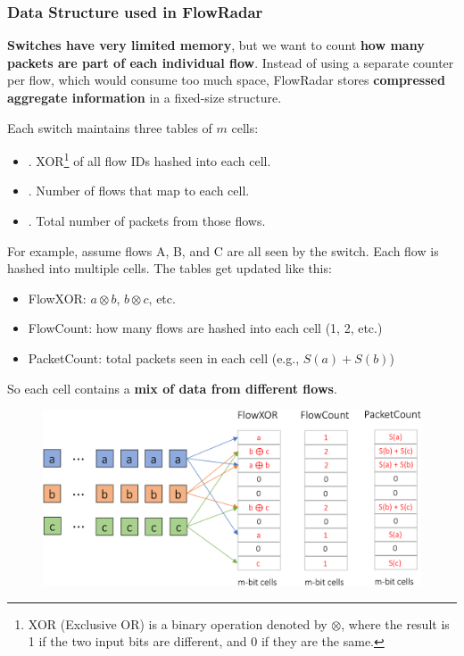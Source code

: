 \subsubsection{Data Structure used in FlowRadar}

\textbf{Switches have very limited memory}, but we want to count \textbf{how many packets are part of each individual flow}. Instead of using a separate counter per flow, which would consume too much space, FlowRadar stores \textbf{compressed aggregate information} in a fixed-size structure.

\highspace
Each switch maintains three tables of $m$ cells:
\begin{itemize}
    \item {}. XOR\footnote{%
        XOR (Exclusive OR) is a binary operation denoted by $\otimes$, where the result is 1 if the two input bits are different, and 0 if they are the same.
    } of all flow IDs hashed into each cell.
    \item {}. Number of flows that map to each cell.
    \item {}. Total number of packets from those flows.
\end{itemize}
For example, assume flows A, B, and C are all seen by the switch. Each flow is hashed into multiple cells. The tables get updated like this:
\begin{itemize}
    \item FlowXOR: $a \otimes b$, $b \otimes c$, etc.
    \item FlowCount: how many flows are hashed into each cell (1, 2, etc.)
    \item PacketCount: total packets seen in each cell (e.g., $S(a) + S(b)$)
\end{itemize}
So each cell contains a \textbf{mix of data from different flows}.
\begin{figure}[!htp]
    \centering
    \includegraphics[width=\textwidth]{img/flowradar-1.pdf}
\end{figure}


